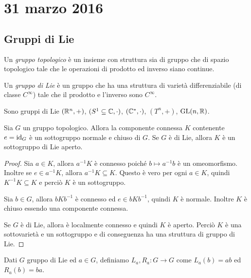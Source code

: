 \chapter{31 marzo 2016}

\section{Gruppi di Lie}

\begin{definition}
	Un \emph{gruppo topologico} è un insieme con struttura sia di gruppo che di spazio topologico tale che le operazioni di prodotto ed inverso siano continue.
\end{definition}

\begin{definition}
	Un \emph{gruppo di Lie} è un gruppo che ha una struttura di varietà differenziabile (di classe $C^\infty$) tale che il prodotto e l'inverso sono $C^\infty$.
\end{definition}

\begin{example}
	Sono gruppi di Lie $(\mathbb R^n,+)$, $(S^1\subseteq \mathbb C, \cdot)$, $(\mathbb C^*,\cdot)$, $(T^n, +)$, $\mathrm{GL}(n,\mathbb R)$.
\end{example}

\begin{proposition}
	Sia $G$ un gruppo topologico. Allora la componente connessa $K$ contenente $e=\mathrm{id}_G$ è un sottogruppo normale e chiuso di $G$. Se $G$ è di Lie, allora $K$ è un sottogruppo di Lie aperto.
\end{proposition}
\begin{proof}
	Sia $a\in K$, allora $a^{-1}K$ è connesso poiché $b\mapsto a^{-1}b$ è un omeomorfismo.
	Inoltre se $e\in a^{-1}K$, allora $a^{-1}K\subseteq K$. Questo è vero per ogni $a\in K$, quindi $K^{-1}K\subseteq K$ e perciò $K$ è un sottogruppo.
	
	Sia $b\in G$, allora $bKb^{-1}$ è connesso ed $e\in bKb^{-1}$, quindi $K$ è normale. Inoltre $K$ è chiuso essendo una componente connessa.
	
	Se $G$ è di Lie, allora è localmente connesso e quindi $K$ è aperto. Perciò $K$ è una sottovarietà e un sottogruppo e di conseguenza ha una struttura di gruppo di Lie.
\end{proof}


\begin{definition}
	Dati $G$ gruppo di Lie ed $a\in G$, definiamo $L_a,R_a:G\to G$ come $L_a(b) = ab$ ed $R_a(b) = ba$.
\end{definition}

